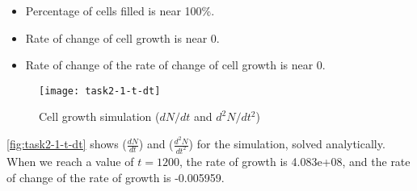 \begin{itemize}
    \item Percentage of cells filled is near 100\%.
    \item Rate of change of cell growth is near 0.
    \item Rate of change of the rate of change of cell growth is near 0.
\end{itemize}

\begin{figure}[ht]
    \centering
    \texttt{[image: task2-1-t-dt]}
    \caption[Cell growth simulation ($dN/dt$ and $d^2N/dt^2$)]{Cell growth simulation ($dN/dt$ and $d^2N/dt^2$)}
    \label{fig:task2-1-t-dt}
\end{figure}









\autoref{fig:task2-1-t-dt} shows ($\frac{dN}{dt}$) and ($\frac{d^2N}{dt^2}$) for the simulation, solved analytically.
When we reach a value of $t = 1200$, the rate of growth is 4.083e+08, and the rate of change of the rate of growth is -0.005959.

